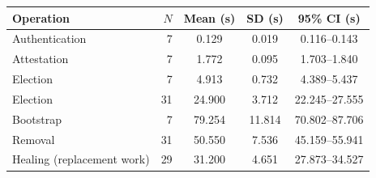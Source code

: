 \begin{tabular}{lrccc}
\hline
\textbf{Operation} & $N$ & \textbf{Mean (s)} & \textbf{SD (s)} & \textbf{95\% CI (s)} \\
\hline
Authentication & 7 & 0.129 & 0.019 & 0.116--0.143 \\
Attestation & 7 & 1.772 & 0.095 & 1.703--1.840 \\
Election & 7 & 4.913 & 0.732 & 4.389--5.437 \\
Election & 31 & 24.900 & 3.712 & 22.245--27.555 \\
Bootstrap & 7 & 79.254 & 11.814 & 70.802--87.706 \\
Removal & 31 & 50.550 & 7.536 & 45.159--55.941 \\
Healing (replacement work) & 29 & 31.200 & 4.651 & 27.873--34.527 \\
\hline
\end{tabular}
